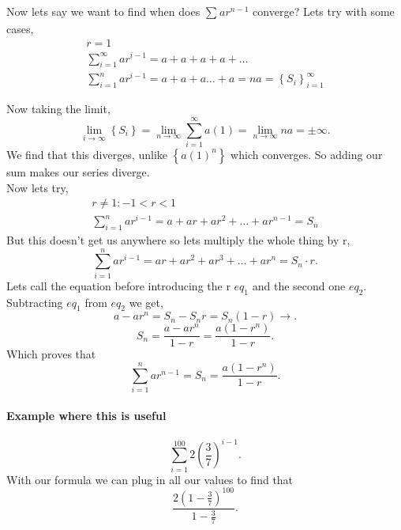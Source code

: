 \documentclass[a4paper]{article}
\begin{document}
Now lets say we want to find when does $ \sum_{  } ^{  } ar^{ n-1 } $ converge? Lets try with some cases,
\begin{gather*}
r=1 \\
\sum_{ i=1 } ^{ \infty } ar^{ i-1 } = a + a + a + a + \ldots \\
\sum_{ i=1 } ^{ n } ar^{ i-1 }= a + a + a \ldots + a = na = \left\{ S_{ i } \right\}^{ \infty }_{ i=1 } 
\end{gather*}

Now taking the limit, 
\[
\lim_{ i \to \infty} \left\{ S_{ i } \right\} =\lim_{ n \to \infty} \sum_{ i=1 } ^{ \infty } a\left( 1 \right) = \lim_{ n \to \infty} na = \pm \infty
.\] 
We find that this diverges, unlike $ \left\{ a\left( 1 \right) ^{ n } \right\}  $ which converges. So adding our sum makes our series diverge. \\

Now lets try,
\begin{gather*}
r\neq 1: -1<r<1\\
\sum_{ i=1 } ^{ n } ar^{ i-1 }=a+ar+ar^2+ \ldots + ar^{ n-1 }= S_{ n }
\end{gather*}
But this doesn't get us anywhere so lets multiply the whole thing by r,
\[
\sum_{ i=1 } ^{ n } ar^{ i-1 }= ar + ar^2+ ar^3+ \ldots + ar^{ n }= S_n \cdot r
.\] 
Lets call the equation before introducing the r $ eq_1 $ and the second one $ eq_2 $. Subtracting $ eq_1 $ from $ eq_2 $ we get,
\[
a-ar^{ n } = S_n - S_n r = S_n\left( 1-r \right) \to
.\] 
\[
S_n=\frac{ a-ar^{ n } }{ 1-r } = \frac{ a\left( 1-r^{ n } \right)  }{ 1-r }
.\] 
Which proves that 
\[
\sum_{ i=1 } ^{ n } ar^{ n-1 }=S_n = \frac{ a\left( 1-r^{ n } \right)  }{ 1-r }
.\] 
\paragraph{Example where this is useful}
\[
\sum_{ i=1 } ^{ 100 } 2\left( \frac{ 3 }{ 7 }  \right) ^{ i-1 }
.\] 
With our formula we can plug in all our values to find that
\[
	\frac{ 2\left( 1-\frac{ 3 }{ 7 }  \right)^{ 100 } }{ 1-\frac{ 3 }{ 7 }  }
.\] 	
\end{document}
